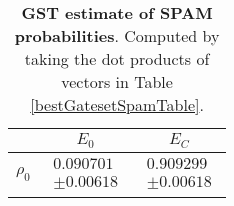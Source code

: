 \documentclass{article}[11pt]
\begin{document}
\begin{table}[h]
\begin{center}
\begin{tabular}[l]{|c|c|c|}
\hline
 & $E_{0}$ & $E_C$ \\ \hline
$\rho_{0}$ & $ \begin{array}{c} 0.090701 \\ \pm 0.00618 \end{array} $ & $ \begin{array}{c} 0.909299 \\ \pm 0.00618 \end{array} $ \\ \hline
\end{tabular}

\caption{\textbf{GST estimate of SPAM probabilities}.  Computed by taking the dot products of vectors in Table \ref{bestGatesetSpamTable}.\label{bestGatesetSpamParametersTable}}
\end{center}
\end{table}
\end{document}
